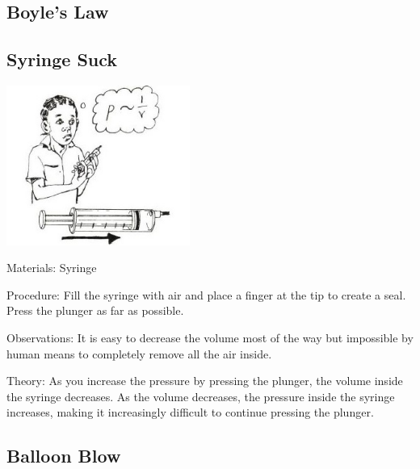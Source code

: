 \begin{multicols}{2}
\subsection*{Boyle's Law}

\subsection{Syringe Suck}

\begin{center}
\includegraphics[width=0.45\textwidth]{./img/source/boyle-syringe.jpg}
\end{center}

\begin{description*}
\item[Materials:]{Syringe}
\item[Procedure:]{Fill the syringe with air and place a finger at the tip to create a seal. Press the plunger as far as possible.}
\item[Observations:]{It is easy to decrease the volume most of the way but impossible by human means to completely remove all the air inside.}
\item[Theory:]{As you increase the pressure by pressing the plunger, the volume inside the syringe decreases. As the volume decreases, the pressure inside the syringe increases, making it increasingly difficult to continue pressing the plunger.}
\end{description*}

\vfill
\columnbreak

\subsection{Balloon Blow}


\end{multicols}
